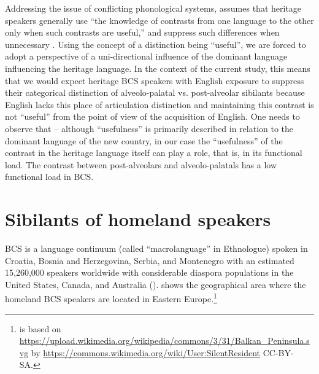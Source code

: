 \documentclass[output=paper,
modfonts,
newtxmath,
hidelinks,
]{langscibook}
\begin{document}
Addressing the issue of conflicting phonological systems, \citet{Polinsky2018} assumes that heritage speakers generally use “the knowledge of contrasts from one language to the other only when such contrasts are useful,” and suppress such differences when unnecessary \citep[115]{Polinsky2018}. Using the concept of a distinction being “useful”, we are forced to adopt a perspective of a uni-directional influence of the dominant language influencing the heritage language. In the context of the current study, this means that we would expect heritage BCS speakers with English exposure to suppress their categorical distinction of alveolo-palatal vs. post-alveolar sibilants because English lacks this place of articulation distinction and maintaining this contrast is not “useful” from the point of view of the acquisition of English. One needs to observe that – although “usefulness” is primarily described in relation to the dominant language of the new country, in our case the “usefulness” of the contrast in the heritage language itself can play a role, that is, in its functional load. The contrast between post-alveolars and alveolo-palatals has a low functional load in BCS.


\section{Sibilants of homeland speakers}\label{sec:mihajlovic:3}

BCS is a language continuum (called “macrolanguage” in Ethnologue) spoken in Croatia, Bosnia and Herzegovina, Serbia, and Montenegro with an estimated 15,260,000 speakers worldwide with considerable diaspora populations in the United States, Canada, and Australia (\citealt{Simons-Fennig2017}).  shows the geographical area where the homeland BCS speakers are located in Eastern Europe.\footnote{ is based on \url{https://upload.wikimedia.org/wikipedia/commons/3/31/Balkan_Peninsula.svg} by \url{https://commons.wikimedia.org/wiki/User:SilentResident} CC-BY-SA.}
\end{document}
